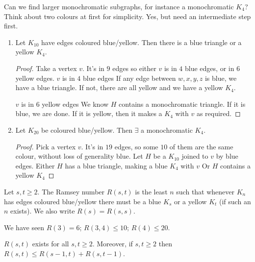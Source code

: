 \documentclass{article}
\begin{document}
Can we find larger monochromatic subgraphs, for instance a monochromatic $K_4$?  Think about two colours at first for simplicity.  Yes, but need an intermediate step first.

\begin{eg}
    \leavevmode
    \begin{enumerate}
        \item Let $K_{10}$ have edges coloured blue/yellow.
            Then there is a blue triangle or a yellow $K_4$.
            \begin{proof}
                Take a vertex $v$. It's in $9$ edges so either $v$ is in $4$ blue edges, or in $6$ yellow edges.
                $v$ is in $4$ blue edges
                If any edge between $w, x, y, z$ is blue, we have a blue triangle.
                If not, there are all yellow and we have a yellow $K_4$.

                $v$ is in $6$ yellow edges We know $H$ contains a monochromatic triangle. If it is blue, we are done.  If it is yellow, then it makes a $K_4$ with $v$ as required.
            \end{proof}
        \item Let $K_{20}$ be coloured blue/yellow. Then $\exists$ a monochromatic $K_4$.
            \begin{proof}
                Pick a vertex $v$. It's in $19$ edges, so some $10$ of them are the same colour, without loss of generality blue.
                Let $H$ be a $K_{10}$ joined to $v$ by blue edges.
                Either $H$ has a blue triangle, making a blue $K_4$ with $v$
                Or $H$ contains a yellow $K_4$
            \end{proof}
    \end{enumerate}
\end{eg}

\begin{defi}
    Let $s, t \geq 2$. The Ramsey number $R(s, t)$ is the least $n$ such that whenever $K_n$ has edges coloured blue/yellow there must be a blue $K_s$ or a yellow $K_t$ (if such an $n$ exists).
    We also write $R(s) = R(s, s)$.
\end{defi}

We have seen $R(3) = 6$; $R(3, 4) \leq 10$; $R(4) \leq 20$.

\begin{nthm}
    $R(s, t)$ exists for all $s, t \geq 2$.  Moreover, if $s, t \geq 2$ then $R(s, t) \leq R(s-1, t) + R(s, t-1)$.
\end{nthm}
\end{document}
